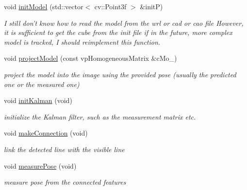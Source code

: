 \begin{DoxyCompactItemize}
void \hyperlink{classhoughLineBasedTracker_a4d3b25defc69d5ec0a7341d0939c19b4}{init\-Model} (std\-::vector$<$ cv\-::\-Point3f $>$ \&init\-P)
\begin{DoxyCompactList}\small\item\em \-I still don't know how to read the model from the wrl or cad or cao file \-However, it is sufficient to get the cube from the init file if in the future, more complex model is tracked, \-I should reimplement this function. \end{DoxyCompactList}\item 
void \hyperlink{classhoughLineBasedTracker_ab2eb9a610b1f7eac11444be87c951710}{project\-Model} (const vp\-Homogeneous\-Matrix \&c\-Mo\-\_\-)
\begin{DoxyCompactList}\small\item\em project the model into the image using the provided pose (usually the predicted one or the measured one) \end{DoxyCompactList}\item 
\hypertarget{classhoughLineBasedTracker_a91d371404d9164b79a76c3a74a51b2f4}{void \hyperlink{classhoughLineBasedTracker_a91d371404d9164b79a76c3a74a51b2f4}{init\-Kalman} (void)}\label{classhoughLineBasedTracker_a91d371404d9164b79a76c3a74a51b2f4}

\begin{DoxyCompactList}\small\item\em initialize the \-Kalman filter, such as the measurement matrix etc. \end{DoxyCompactList}\item 
\hypertarget{classhoughLineBasedTracker_ab69775ffac23095590728097872f2bc7}{void \hyperlink{classhoughLineBasedTracker_ab69775ffac23095590728097872f2bc7}{make\-Connection} (void)}\label{classhoughLineBasedTracker_ab69775ffac23095590728097872f2bc7}

\begin{DoxyCompactList}\small\item\em link the detected line with the visible line \end{DoxyCompactList}\item 
\hypertarget{classhoughLineBasedTracker_a53f0e0b7c4640fca24d1795c0a73256f}{void \hyperlink{classhoughLineBasedTracker_a53f0e0b7c4640fca24d1795c0a73256f}{measure\-Pose} (void)}\label{classhoughLineBasedTracker_a53f0e0b7c4640fca24d1795c0a73256f}

\begin{DoxyCompactList}\small\item\em measure pose from the connected features \end{DoxyCompactList}\end{DoxyCompactItemize}
